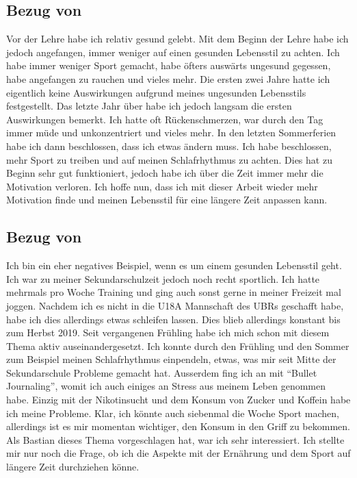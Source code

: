 \subsection{Bezug von \dario}
\authortoc{\dario}{\subsectionident}
\label{bezug:dario}
Vor der Lehre habe ich relativ gesund gelebt. Mit dem Beginn der Lehre habe ich jedoch angefangen, immer weniger auf einen gesunden Lebensstil zu achten.
\newline
Ich habe immer weniger Sport gemacht, habe öfters auswärts ungesund gegessen, habe angefangen zu rauchen und vieles mehr. 
\newline
Die ersten zwei Jahre hatte ich eigentlich keine Auswirkungen aufgrund meines ungesunden Lebensstils festgestellt.
\newline
Das letzte Jahr über habe ich jedoch langsam die ersten Auswirkungen bemerkt. Ich hatte oft Rückenschmerzen, war durch den Tag immer müde und unkonzentriert und vieles mehr.
\newline
In den letzten Sommerferien habe ich dann beschlossen, dass ich etwas ändern muss. Ich habe beschlossen, mehr Sport zu treiben und auf meinen Schlafrhythmus zu achten. 
\newline
Dies hat zu Beginn sehr gut funktioniert, jedoch habe ich über die Zeit immer mehr die Motivation verloren.
\newline
Ich hoffe nun, dass ich mit dieser Arbeit wieder mehr Motivation finde und meinen Lebensstil für eine längere Zeit anpassen kann.
\subsection{Bezug von \jonas}
\authortoc{\jonas}{\subsectionident}
\label{bezug:jonas}
Ich bin ein eher negatives Beispiel, wenn es um einem gesunden Lebensstil geht. Ich war zu meiner Sekundarschulzeit jedoch noch recht sportlich. Ich hatte mehrmals pro Woche Training und ging auch sonst gerne in meiner Freizeit mal joggen. Nachdem ich es nicht in die U18A Mannschaft des \acsp{UBR} geschafft habe, habe ich dies allerdings etwas schleifen lassen.
\newline
Dies blieb allerdings konstant bis zum Herbst 2019. Seit vergangenen Frühling habe ich mich schon mit diesem Thema aktiv auseinandergesetzt. Ich konnte durch den Frühling und den Sommer zum Beispiel meinen Schlafrhythmus einpendeln, etwas, was mir seit Mitte der Sekundarschule Probleme gemacht hat. Ausserdem fing ich an mit “Bullet Journaling”, womit ich auch einiges an Stress aus meinem Leben genommen habe. Einzig mit der Nikotinsucht und dem Konsum von Zucker und Koffein habe ich meine Probleme. Klar, ich könnte auch siebenmal die Woche Sport machen, allerdings ist es mir momentan wichtiger, den Konsum in den Griff zu bekommen.
\newline
\newline
Als Bastian dieses Thema vorgeschlagen hat, war ich sehr interessiert. Ich stellte mir nur noch die Frage, ob ich die Aspekte mit der Ernährung und dem Sport auf längere Zeit durchziehen könne.